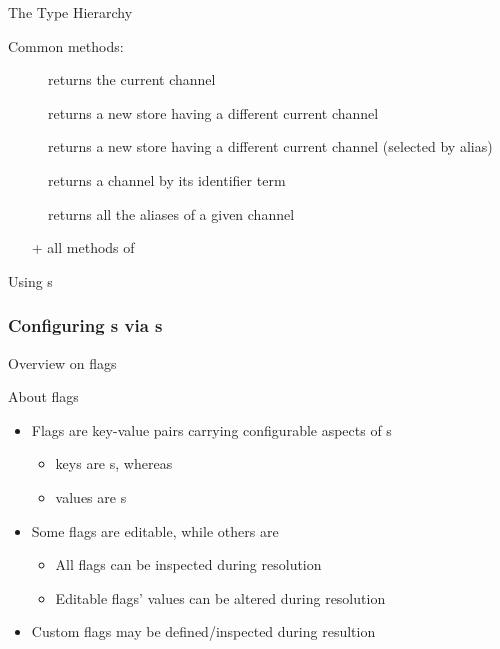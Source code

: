 \documentclass[handout]{beamer}
\begin{document}
\begin{frame}[allowframebreaks]{The  Type Hierarchy}
    \framebreak

    Common methods:
    \begin{description}
        \item[] returns the current channel
        \item[] returns a new store having a different current channel
        \item[] returns a new store having a different current channel (selected by \alert{alias})
        \item[] returns a channel by its identifier term
        \item[] returns all the aliases of a given channel
    \end{description}
    \begin{itemize}
        \item[+] all methods of 
    \end{itemize}
\end{frame}

\begin{frame}{Using s}
\end{frame}

\subsubsection{Configuring s via s}

\begin{frame}{Overview on flags}
    \begin{block}{About flags}
        \begin{itemize}
            \item Flags are key-value pairs carrying configurable aspects of s
            \begin{itemize}
                \item \alert{keys} are s, whereas
                \item \alert{values} are s
            \end{itemize}
            \item Some flags are editable, while others are 
            \begin{itemize}
                \item All flags can be inspected during resolution
                \item Editable flags' values can be altered during resolution
            \end{itemize}
            \item Custom flags may be defined/inspected during resultion
        \end{itemize}
    \end{block}
\end{frame}
\end{document}
